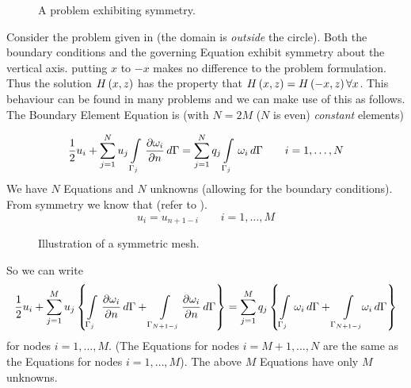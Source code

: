 \begin{figure} \centering
  
  \caption{A problem exhibiting symmetry.} 
  \label{fig:symcirc}
\end{figure}

Consider the problem given in  (the domain is
\emph{outside} the circle).  Both the boundary conditions and the governing
Equation exhibit symmetry about the vertical axis. \ie putting $x$ to $-x$
makes no difference to the problem formulation.  Thus the solution
$ H\left( x,z \right) $ has the property that $ H\left( x,z \right)  =  H\left( -x,z \right)  \forall
x$. This behaviour can be found in many problems and we can make use of this
as follows. The Boundary Element Equation is (with $N=2M$ (\ie $N$ is even)
\emph{constant} elements)

\begin{equation}
  \dfrac{1}{2} u_{i} +  \displaystyle\sum_{j=1}^{N}  u_{j}   \displaystyle\int\limits_{\Gamma_{j}}^{} \, \dfrac{\partial \omega_{i}}{\partial n} \,d\Gamma  =  \displaystyle\sum_{j=1}^{N}  q_{j}
    \displaystyle\int\limits_{\Gamma_{j}}^{} \,\omega_{i}\,d\Gamma  \qquad i=1,\ldots,N
  \label{eqn:bemeq}
\end{equation}
We have $N$ Equations and $N$ unknowns (allowing for the boundary conditions).
From symmetry we know that (refer to ).
\begin{equation}
  u_{i} = u_{n+1-i} \qquad i=1,\ldots,M
  \label{eqn:symmetry}
\end{equation}
\begin{figure} \centering
  
  \caption{Illustration of a symmetric mesh.}
  \label{fig:symcirc2}
\end{figure}
So we can write
\begin{equation}
  \dfrac{1}{2} u_{i} +  \displaystyle\sum_{j=1}^{M}  u_{j} \left\{   \displaystyle\int\limits_{\Gamma_{j}}^{} \, \dfrac{\partial \omega_{i}}{\partial n} \,d\Gamma  +   \displaystyle\int\limits_{\Gamma_{N+1-j}}^{} \,\negthickspace  \dfrac{\partial \omega_{i}}{\partial n} \,d\Gamma  \right\} =  \displaystyle\sum_{j=1}^{M}  q_{j} 
  \left\{   \displaystyle\int\limits_{\Gamma_{j}}^{} \,\omega_{i}\,d\Gamma  
    +   \displaystyle\int\limits_{\Gamma_{N+1-j}}^{} \,\negthickspace \negthickspace\omega_{i}\,d\Gamma  \right\}
  \label{eqn:nodes}
\end{equation}
for nodes $i=1,\ldots,M$. (The Equations for nodes $i=M+1,\ldots,N$ are the same as
the Equations for nodes $i=1,\ldots,M$). The above $M$ Equations have only $M$
unknowns.

